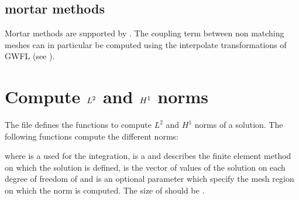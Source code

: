\documentclass[a4paper,11pt,english]{sphinxmanual}
\begin{document}
\section{mortar methods}
\label{\detokenize{userdoc/interNMM:mortar-methods}}
Mortar methods are supported by . The coupling term between non matching
meshes can in particular be computed using the interpolate transformations of
GWFL (see {\hyperref[\detokenize{userdoc/gasm_high:ud-gasm-high-transf}]{}}).


\chapter{Compute \protect\(L^2\protect\) and \protect\(H^1\protect\) norms}
\label{\detokenize{userdoc/computeL2H1:compute-l-2-and-h-1-norms}}\label{\detokenize{userdoc/computeL2H1:ud-computel2h1}}\label{\detokenize{userdoc/computeL2H1::doc}}
The file  defines the functions to compute
\(L^2\) and \(H^1\) norms of a solution. The following functions compute
the different norms:

\begin{sphinxVerbatim}[commandchars=\\\{\}]
     
     
     
\end{sphinxVerbatim}

where  is a  used for the integration,  is a  and
describes the finite element method on which the solution is defined,  is the
vector of values of the solution on each degree of freedom of  and  is an optional parameter which specify the mesh region on which the norm is computed. The size of
 should be .
\end{document}
